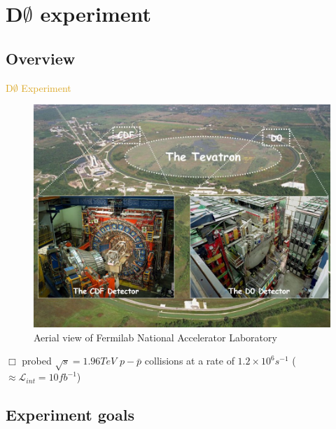 

\section{D$\emptyset$ experiment}
\subsection{Overview}

\begin{frame}{\textcolor{Goldenrod}{D$\emptyset$ Experiment}}
  \begin{overlayarea}{\textwidth}{\textheight}
    \begin{figure}[h]\centering
      \includegraphics[height=0.5\textheight]{./Images/02_D0_general.jpg}
      \caption*{Aerial view of Fermilab National Accelerator Laboratory}
    \end{figure}
    \itt
  \item[$\Box$] probed $\sqrt{s} = 1.96 TeV$ $p-\bar{p}$ collisions at a rate of
    \alert{$1.2\times 10^{6} s^{-1}$} (\alert{$\approx \mathcal{L}_{int} = 10 fb^{-1}$})
    \tti
  \end{overlayarea}
\end{frame}

\subsection{Experiment goals}

